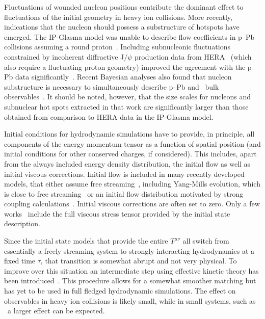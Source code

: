 Fluctuations of wounded nucleon positions contribute the dominant effect to 
  fluctuations of the initial geometry in heavy ion collisions. 
More recently, indications that the nucleon should possess a substructure of hotspots 
  have emerged. 
The IP-Glasma model was unable to describe flow coefficients in p--Pb 
  collisions assuming a round proton~\cite{Schenke:2014zha}. 
Including subnucleonic fluctuations constrained by incoherent 
  diffractive J$/\psi$ production data from HERA~\cite{Mantysaari:2016ykx} 
  (which also require a fluctuating proton geometry) improved the agreement 
  with the p--Pb data significantly~\cite{Mantysaari:2017cni}. 
Recent Bayesian analyses also found that nucleon substructure is necessary 
  to simultaneously describe p--Pb and \pbpb\ bulk observables~\cite{Moreland:2018gsh}.
It should be noted, however, that the size scales for nucleons and subnuclear 
  hot spots extracted in that work are significantly larger than those obtained
  from comparison to HERA data in the IP-Glasma model.

Initial conditions for hydrodynamic simulations have to provide, in principle, 
  all components of the energy momentum tensor as a function of spatial position 
  (and initial conditions for other conserved charges, if considered). 
This includes, apart from the always included energy density distribution, 
  the initial flow as well as initial viscous corrections. 
Initial flow is included in many recently developed models, that either assume 
  free streaming~\cite{Moreland:2018gsh}, including Yang-Mills evolution, which 
  is close to free streaming~\cite{Gale:2012rq} or an initial flow distribution 
  motivated by strong coupling calculations~\cite{Weller:2017tsr}. 
Initial viscous corrections are often set to zero. 
Only a few works~\cite{Mantysaari:2017cni,Schenke:2018fci,Moreland:2018gsh} 
  include the full viscous stress tensor provided by the initial state description.

Since the initial state models that provide the entire $T^{\mu\nu}$ all switch 
  from essentially a freely streaming system to strongly interacting hydrodynamics 
  at a fixed time $\tau$, that transition is somewhat abrupt and not very physical. 
To improve over this situation an intermediate step using effective kinetic theory 
  has been introduced~\cite{Kurkela:2018wud,Kurkela:2018vqr}. 
This procedure allows for a somewhat smoother matching but has yet to be used in 
  full fledged hydrodynamic simulations. 
The effect on observables in heavy ion collisions is likely small, while in small 
  systems, such as \pA\ a larger effect can be expected.

